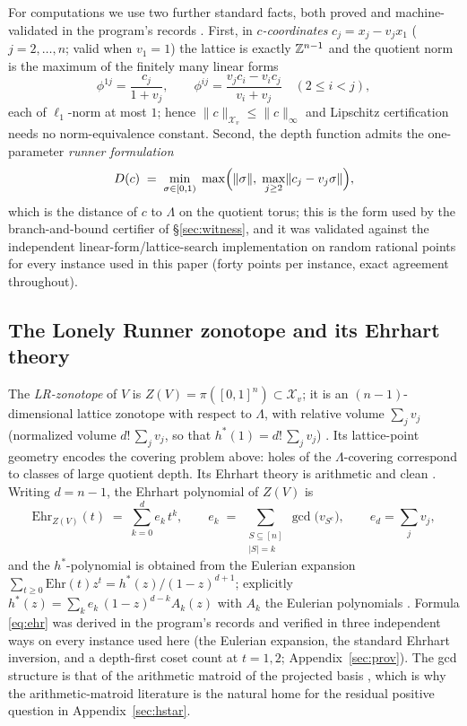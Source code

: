 For computations we use two further standard facts, both proved and
machine-validated in the program's records \cite{prog-artifacts}. First,
in \emph{$c$-coordinates} $c_j=x_j-v_jx_1$ ($j=2,\dots,n$; valid when
$v_1=1$) the lattice is exactly $\mathbb{Z}^{n-1}$ and the quotient norm is the
maximum of the finitely many linear forms
\[
\phi^{1j}=\frac{c_j}{1+v_j},\qquad
\phi^{ij}=\frac{v_jc_i-v_ic_j}{v_i+v_j}\quad(2\le i<j),
\]
each of $\ell_1$-norm at most $1$; hence
$\|c\|_{\mathcal{X}_v}\le\|c\|_\infty$ and Lipschitz certification
needs no norm-equivalence constant. Second, the depth function admits the
one-parameter \emph{runner formulation}
\begin{equation}\label{eq:runnerform}
D(c)\;=\;\min_{\sigma\in[0,1)}\;\max\Bigl(\lVert \sigma \rVert,\;
\max_{j\ge 2}\lVert c_j-v_j\sigma \rVert\Bigr),
\end{equation}
which is the distance of $c$ to $\Lambda$ on the quotient torus; this is
the form used by the branch-and-bound certifier of \S\ref{sec:witness},
and it was validated against the independent linear-form/lattice-search
implementation on random rational points for every instance used in this
paper (forty points per instance, exact agreement throughout).

\subsection{The Lonely Runner zonotope and its Ehrhart theory}

The \emph{LR-zonotope} of $V$ is $Z(V)=\pi([0,1]^n)\subset
\mathcal{X}_v$; it is an $(n{-}1)$-dimensional lattice zonotope with
respect to $\Lambda$, with relative volume $\sum_j v_j$ (normalized
volume $d!\,\sum_j v_j$, so that $h^*(1)=d!\,\sum_j v_j$)
\cite{Shephard,BeckRobins}. Its lattice-point geometry encodes the
covering problem above: holes of the $\Lambda$-covering correspond to
classes of large quotient depth. Its Ehrhart theory is arithmetic and
clean \cite{BeckRobins,dAMoci,StanleyEC}. Writing $d=n-1$, the Ehrhart
polynomial of $Z(V)$ is
\begin{equation}\label{eq:ehr}
\mathrm{Ehr}_{Z(V)}(t)\;=\;\sum_{k=0}^{d} e_k\,t^k,\qquad
e_k\;=\;\sum_{\substack{S\subseteq[n]\\|S|=k}}\gcd\!\bigl(v_{S^c}\bigr),
\qquad e_d=\sum_j v_j,
\end{equation}
and the $h^*$-polynomial is obtained
from the Eulerian expansion
$\sum_{t\ge0}\mathrm{Ehr}(t)z^t=h^*(z)/(1-z)^{d+1}$; explicitly
$h^*(z)=\sum_k e_k\,(1-z)^{d-k}A_k(z)$ with $A_k$ the Eulerian
polynomials \cite{Frobenius}. Formula \eqref{eq:ehr} was derived in the
program's records and verified in three independent ways on every
instance used here (the Eulerian expansion, the standard Ehrhart
inversion, and a depth-first coset count at $t=1,2$;
Appendix~\ref{sec:prov}). The gcd structure is that of the arithmetic
matroid of the projected basis \cite{dAMoci}, which is why the
arithmetic-matroid literature is the natural home for the residual
positive question in Appendix~\ref{sec:hstar}.

